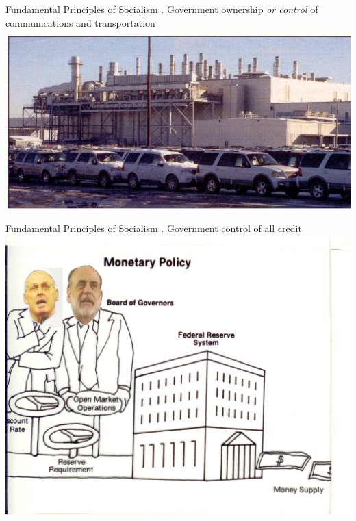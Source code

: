 \begin{frame}{Fundamental Principles of Socialism}
    . Government ownership \emph{or control} of communications and transportation \\
    \includegraphics[width=.9\textwidth]{img/transportation.jpg} \\
\end{frame}

\begin{frame}{Fundamental Principles of Socialism}
    . Government control of all credit \\
    \includegraphics[width=.9\textwidth]{img/credit.png} \\
\end{frame}

